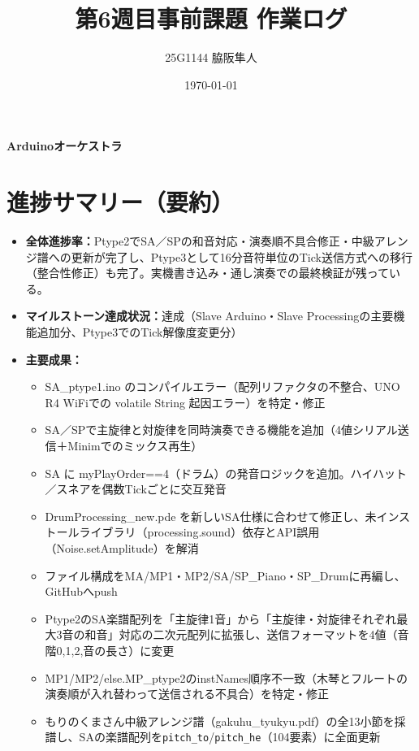 \documentclass[uplatex,dvipdfmx]{jlreq}
\begin{document}
\title{\textbf{第6週目事前課題 作業ログ}}
\author{25G1144 脇阪隼人}
\date{\today}
\maketitle

\noindent
\textbf{Arduinoオーケストラ}

\bigskip

\section{進捗サマリー（要約）}

\begin{itemize}
    \item \textbf{全体進捗率：}Ptype2でSA／SPの和音対応・演奏順不具合修正・中級アレンジ譜への更新が完了し、Ptype3として16分音符単位のTick送信方式への移行（整合性修正）も完了。実機書き込み・通し演奏での最終検証が残っている。
    \item \textbf{マイルストーン達成状況：}達成（Slave Arduino・Slave Processingの主要機能追加分、Ptype3でのTick解像度変更分）
    \item \textbf{主要成果：}
    \begin{itemize}
        \item SA\_ptype1.ino のコンパイルエラー（配列リファクタの不整合、UNO R4 WiFiでの volatile String 起因エラー）を特定・修正
        \item SA／SPで主旋律と対旋律を同時演奏できる機能を追加（4値シリアル送信＋Minimでのミックス再生）
        \item SA に myPlayOrder==4（ドラム）の発音ロジックを追加。ハイハット／スネアを偶数Tickごとに交互発音
        \item DrumProcessing\_new.pde を新しいSA仕様に合わせて修正し、未インストールライブラリ（processing.sound）依存とAPI誤用（Noise.setAmplitude）を解消
        \item ファイル構成をMA/MP1・MP2/SA/SP\_Piano・SP\_Drumに再編し、GitHubへpush
        \item Ptype2のSA楽譜配列を「主旋律1音」から「主旋律・対旋律それぞれ最大3音の和音」対応の二次元配列に拡張し、送信フォーマットを4値（音階0,1,2,音の長さ）に変更
        \item MP1/MP2/else.MP\_ptype2のinstNames順序不一致（木琴とフルートの演奏順が入れ替わって送信される不具合）を特定・修正
        \item もりのくまさん中級アレンジ譜（gakuhu\_tyukyu.pdf）の全13小節を採譜し、SAの楽譜配列を\texttt{pitch\_to}/\texttt{pitch\_he}（104要素）に全面更新

\end{itemize}
\end{itemize}
\end{document}
